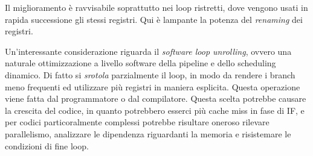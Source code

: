 \noindent Il miglioramento è ravvisabile soprattutto nei loop ristretti, dove vengono usati in rapida successione gli stessi registri. Qui è lampante la potenza del \textit{renaming} dei registri. 

\begin{info}
    Un'interessante considerazione riguarda il \textit{software loop unrolling}, ovvero una naturale ottimizzazione a livello software della pipeline e dello scheduling dinamico. Di fatto si \textit{srotola} parzialmente il loop, in modo da rendere i branch meno frequenti ed utilizzare più registri in maniera esplicita. Questa operazione viene fatta dal programmatore o dal compilatore. Questa scelta potrebbe causare la crescita del codice, in quanto potrebbero esserci più cache miss in fase di IF, e per codici particoralmente complessi potrebbe risultare oneroso rilevare parallelismo, analizzare le dipendenza riguardanti la memoria e risistemare le condizioni di fine loop.
\end{info}
